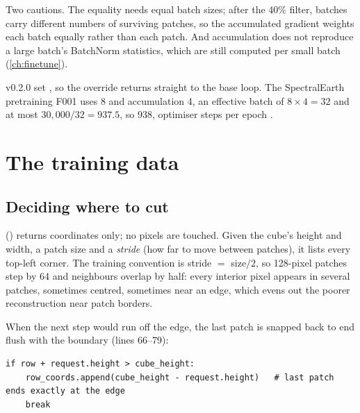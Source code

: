 Two cautions. The equality needs equal batch sizes; after the 40\% filter, batches carry
different numbers of surviving patches, so the accumulated gradient weights each batch equally
rather than each patch. And accumulation does not reproduce a large batch's BatchNorm
statistics, which are still computed per small batch (\cref{ch:finetune}).

\begin{drift}
v0.2.0 set , so the override returns straight to the base
loop. The SpectralEarth pretraining F001 uses  8 and accumulation 4, an
effective batch of $8 \times 4 = 32$ and at most $30{,}000/32 = 937.5$, so 938, optimiser steps
per epoch .
\end{drift}

\section{The training data}\label{sec:trainloop:data}


\subsection{Deciding where to cut}

 () returns
coordinates only; no pixels are touched. Given the cube's height and width, a patch size and a
\emph{stride} (how far to move between patches), it lists every top-left corner.
The training convention is stride $=$ size$/2$, so 128-pixel patches step by 64 and neighbours
overlap by half: every interior pixel appears in several patches, sometimes centred, sometimes
near an edge, which evens out the poorer reconstruction near patch borders.

When the next step would run off the edge, the last patch is snapped back to end flush with
the boundary (lines 66--79):
\begin{lstlisting}
if row + request.height > cube_height:
    row_coords.append(cube_height - request.height)   # last patch ends exactly at the edge
    break
\end{lstlisting}


